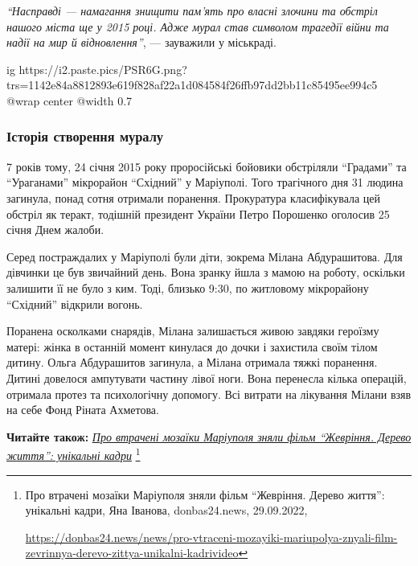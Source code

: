 \begin{leftbar}
\emph{\enquote{Насправді — намагання знищити пам'ять про власні злочини та обстріл нашого
міста ще у 2015 році. Адже мурал став символом трагедії війни та надії на мир й
відновлення}}, — зауважили у міськраді.
\end{leftbar}


\ifcmt
  ig https://i2.paste.pics/PSR6G.png?trs=1142e84a8812893e619f828af22a1d084584f26ffb97dd2bb11c85495ee994c5
  @wrap center
  @width 0.7
\fi


\subsubsection{Історія створення муралу}

7 років тому, 24 січня 2015 року проросійські бойовики обстріляли \enquote{Градами} та
\enquote{Ураганами} мікрорайон \enquote{Східний} у Маріуполі. Того трагічного дня 31 людина
загинула, понад сотня отримали поранення. Прокуратура класифікувала цей обстріл
як теракт, тодішній президент України Петро Порошенко оголосив 25 січня Днем
жалоби.

Серед постраждалих у Маріуполі були діти, зокрема Мілана Абдурашитова. Для
дівчинки це був звичайний день. Вона зранку йшла з мамою на роботу, оскільки
залишити її не було з ким. Тоді, близько 9:30, по житловому мікрорайону
\enquote{Східний} відкрили вогонь.

Поранена осколками снарядів, Мілана залишається живою завдяки героїзму матері:
жінка в останній момент кинулася до дочки і захистила своїм тілом дитину. Ольга
Абдурашитов загинула, а Мілана отримала тяжкі поранення. Дитині довелося
ампутувати частину лівої ноги. Вона перенесла кілька операцій, отримала протез
та психологічну допомогу. Всі витрати на лікування Мілани взяв на себе Фонд
Ріната Ахметова.

\textbf{Читайте також:} \href{https://donbas24.news/news/pro-vtraceni-mozayiki-mariupolya-znyali-film-zevrinnya-derevo-zittya-unikalni-kadrivideo}{\emph{Про втрачені мозаїки Маріуполя зняли фільм \enquote{Жевріння. Дерево життя}: унікальні кадри}}%
\footnote{Про втрачені мозаїки Маріуполя зняли фільм \enquote{Жевріння. Дерево життя}: унікальні кадри, Яна Іванова, donbas24.news, 29.09.2022, \par%
\url{https://donbas24.news/news/pro-vtraceni-mozayiki-mariupolya-znyali-film-zevrinnya-derevo-zittya-unikalni-kadrivideo}%
}

